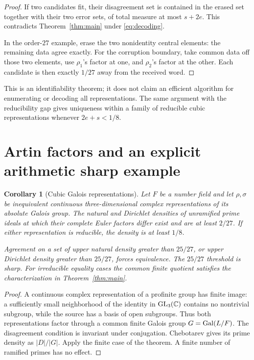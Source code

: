 \documentclass[11pt]{article}
\newtheorem{corollary}[theorem]{Corollary}
\theoremstyle{definition}\newtheorem{definition}[theorem]{Definition}
\theoremstyle{remark}\newtheorem{remark}[theorem]{Remark}
\newcommand{\C}{\mathbb C}\newcommand{\Q}{\mathbb Q}\newcommand{\F}{\mathbb F}\newcommand{\Z}{\mathbb Z}
\begin{document}
\begin{proof}
If two candidates fit, their disagreement set is contained in the erased set together with their two error sets, of total measure at most $s+2e$. This contradicts Theorem~\ref{thm:main} under \eqref{eq:decoding}.

In the order-$27$ example, erase the two nonidentity central elements: the remaining data agree exactly. For the corruption boundary, take common data off those two elements, use $\rho_1$'s factor at one, and $\rho_2$'s factor at the other. Each candidate is then exactly $1/27$ away from the received word.
\end{proof}

This is an identifiability theorem; it does not claim an efficient algorithm for enumerating or decoding all representations. The same argument with the reducibility gap gives uniqueness within a family of reducible cubic representations whenever $2e+s<1/8$.

\section{Artin factors and an explicit arithmetic sharp example}

\begin{corollary}[Cubic Galois representations]\label{cor:artin}
Let $F$ be a number field and let $\rho,\sigma$ be inequivalent continuous three-dimensional complex representations of its absolute Galois group. The natural and Dirichlet densities of unramified prime ideals at which their complete Euler factors differ exist and are at least $2/27$. If either representation is reducible, the density is at least $1/8$.

Agreement on a set of upper natural density greater than $25/27$, or upper Dirichlet density greater than $25/27$, forces equivalence. The $25/27$ threshold is sharp. For irreducible equality cases the common finite quotient satisfies the characterization in Theorem~\ref{thm:main}.
\end{corollary}

\begin{proof}
A continuous complex representation of a profinite group has finite image: a sufficiently small neighborhood of the identity in $\GL_3(\C)$ contains no nontrivial subgroup, while the source has a basis of open subgroups. Thus both representations factor through a common finite Galois group $G=\operatorname{Gal}(L/F)$. The disagreement condition is invariant under conjugation. Chebotarev gives its prime density as $|D|/|G|$. Apply the finite case of the theorem. A finite number of ramified primes has no effect.
\end{proof}
\end{document}
